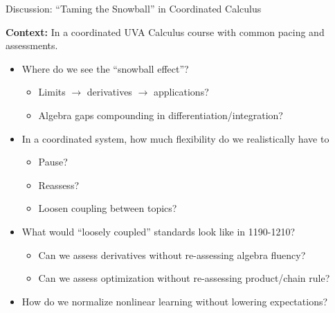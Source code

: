 \documentclass[dvipsnames]{beamer}
\begin{document}

\begin{frame}{Discussion: ``Taming the Snowball'' in Coordinated Calculus}

\textbf{Context:} In a coordinated UVA Calculus course with common pacing and assessments.

\vspace{0.5em}

\begin{itemize}
\item Where do we see the ``snowball effect''?
\begin{itemize}
    \item Limits $\rightarrow$ derivatives $\rightarrow$ applications?
    \item Algebra gaps compounding in differentiation/integration?
\end{itemize}

\item In a coordinated system, how much flexibility do we realistically have to
\begin{itemize}
    \item Pause?
    \item Reassess?
    \item Loosen coupling between topics?
\end{itemize}

\item What would ``loosely coupled'' standards look like in 1190-1210?
\begin{itemize}
    \item Can we assess derivatives without re-assessing algebra fluency?
    \item Can we assess optimization without re-assessing product/chain rule?
\end{itemize}

\item How do we normalize nonlinear learning without lowering expectations?
\end{itemize}
\end{frame}
\end{document}
